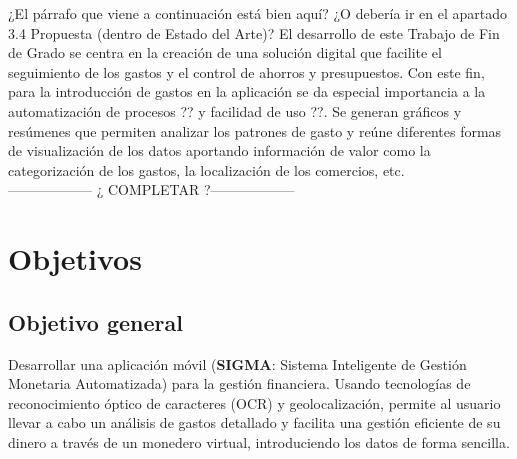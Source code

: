 ¿El párrafo que viene a continuación está bien aquí?
¿O debería ir en el apartado 3.4 Propuesta (dentro de Estado del Arte)?
El desarrollo de este Trabajo de Fin de Grado se centra en la creación de una solución digital que 
facilite el seguimiento de los gastos y el control de ahorros y presupuestos. Con este fin, 
para la introducción de gastos en la aplicación se da especial importancia a la automatización 
de procesos ?? y facilidad de uso ??. Se generan gráficos y resúmenes que permiten analizar los
patrones de gasto y reúne diferentes formas de visualización de los datos aportando información 
de valor como la categorización de los gastos, la localización de los comercios, etc.\\

------------------ ¿ COMPLETAR ?------------------


\section{Objetivos} \label{sect:goals}
\subsection{Objetivo general}
Desarrollar una aplicación móvil (\textbf{SIGMA}: Sistema Inteligente de Gestión Monetaria Automatizada) 
para la gestión financiera. Usando tecnologías de reconocimiento
óptico de caracteres (OCR) y geolocalización, permite al usuario llevar a cabo un 
análisis de gastos detallado y facilita una gestión eficiente de su dinero
a través de un monedero virtual, introduciendo los datos de 
forma sencilla.

